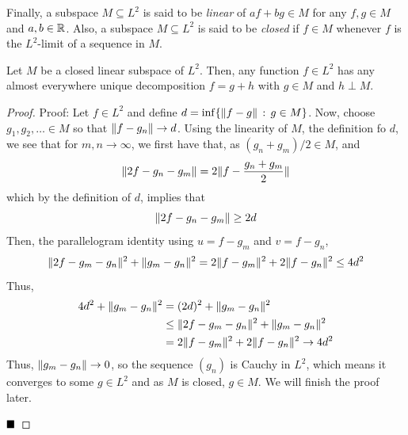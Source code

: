 Finally, a subspace $M \subseteq L^2$ is said to be \emph{linear} of $af + bg \in M$ for any $f, g \in M$ and $a, b \in \mathbb{R}$. Also, a subspace $M \subseteq L^2$ is said to be \emph{closed} if $f \in M$ whenever $f$ is the $L^2$-limit of a sequence in $M$. 

\begin{theorem}
    Let $M$ be a closed linear subspace of $L^2$. Then, any function $f \in L^2$ has any almost everywhere unique decomposition $f = g + h$ with $g \in M$ and $h \perp M$. 
\end{theorem}
\begin{proof}{Proof:}
    Let $f \in L^2$ and define $d = \inf\{\lVert {f - g} \rVert \, :\, g \in M\}$. Now, choose $g_1, g_2, \ldots \in M$ so that $\lVert {f - g_n} \rVert \to d$. Using the linearity of $M$, the definition fo $d$, we see that for $m, n \to \infty$, we first have that, as $(g_n + g_m)/2 \in M$, and
    \[ \lVert {2f - g_n - g_m} \rVert = 2\lVert {f - \frac{g_n + g_m}{2}} \rVert \]
    which by the definition of $d$, implies that
    \[ \lVert {2f - g_n - g_m} \rVert \geq 2d\]
    Then, the parallelogram identity using $u = f - g_m$ and $v = f - g_n$, 
    \[ \lVert {2f - g_m - g_n} \rVert^2 + \lVert {g_m - g_n} \rVert^2 = 2\lVert {f - g_m} \rVert^2 + 2\lVert {f - g_n} \rVert^2 \leq 4d^2 \]
    Thus, 
    \begin{align*}
        4d^2 + \lVert {g_m - g_n} \rVert^2 &= (2d)^2 + \lVert {g_m - g_n} \rVert^2\\
        &\leq \lVert {2f - g_m - g_n} \rVert^2 + \lVert {g_m - g_n} \rVert^2\\
        &= 2\lVert {f - g_m} \rVert^2 + 2\lVert {f - g_n} \rVert^2 \to 4d^2
    \end{align*}
    Thus, $\lVert {g_m - g_n} \rVert \to 0$, so the sequence $(g_n)$ is Cauchy in $L^2$, which means it converges to some $g \in L^2$ and as $M$ is closed, $g \in M$. We will finish the proof later. 

    $\qed$
\end{proof}

